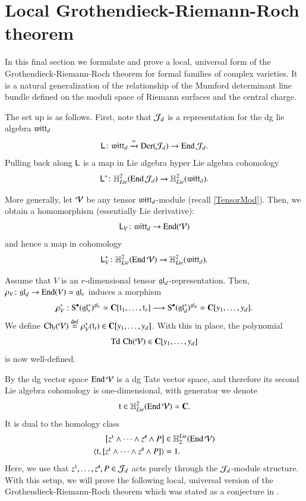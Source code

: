 \documentclass[main.tex]{subfiles}
\begin{document}
\section{Local Grothendieck-Riemann-Roch theorem}\label{s:GRR}

In this final section we formulate and prove a local, universal form of the Grothendieck-Riemann-Roch theorem for
formal families of complex varieties.
It is a natural generalization of the relationship of the Mumford determinant line bundle defined on the
moduli space of Riemann surfaces and the central charge. 

The set up is as follows.
First, note that $\mathcal J_d$ is a representation for the dg lie algebra $\mathfrak{witt}_d$
\[
 \mathsf L \colon \mathfrak{witt}_d \xrightarrow{\simeq} \operatorname{Der}( \mathcal J_d) \to \operatorname{End} \mathcal J_d .
\]
Pulling back along $\mathsf L$ is a map in Lie algebra hyper Lie algebra cohomology 
\begin{equation}\label{}
  \mathsf L^* \colon \mathbb H^2_{Lie}(\operatorname{End} \mathcal J_d) \to \mathbb H^2_{Lie} (\mathfrak{witt}_d) . 
\end{equation}

More generally, let $\mathcal V$ be any tensor $\mathfrak{witt}_d$-module (recall \ref{TensorMod}). 
Then, we obtain a homomorphism (essentially Lie derivative): 
\begin{equation}\label{}
  \mathsf L_{V} \colon \mathfrak{witt}_d \to \operatorname{End}(\mathcal V)  
\end{equation}
and hence a map in cohomology 
\begin{equation}\label{}
  \mathsf L_V^* \colon \mathbb H^2_{Lie}(\operatorname{End} \mathcal V) \to \mathbb H^2_{Lie}(\mathfrak{witt}_d) .
\end{equation}

Assume that $V$ is an $r$-dimensional tensor $\mathfrak{gl}_d$-representation. 
Then, $\rho_V \colon \mathfrak{gl}_d \to \operatorname{End}(V)\simeq \mathfrak{gl}_r$ induces a morphism
\[
\rho_V^*: \operatorname{S}^\bullet(\mathfrak{gl}_r^*)^{\mathfrak{gl}_r}\simeq \mathbf{C}[\mathfrak{t}_1,\ldots,\mathfrak{t}_r]\longrightarrow \operatorname{S}^\bullet(\mathfrak{gl}_d^*)^{\mathfrak{gl}_d}\simeq \mathbf{C}[y_1,\ldots,y_d].
\]
We define $\operatorname{Ch}_i(\mathcal V) \overset{\rm def}{=} \rho_V^*(\mathfrak{t}_i)\in \mathbf{C}[y_1,\ldots,y_d]$. With this in place, the polynomial
\[
\operatorname{Td}\,\operatorname{Ch}(\mathcal V)\in \mathbf{C}[y_1,\ldots,y_d]
\]
is now well-defined.

By \cite[theorem 5.4.16]{FHK} the dg vector space $\operatorname{End} \mathcal V$ is a dg Tate vector space, and therefore its second Lie algebra
cohomology is one-dimensional, with generator we denote 
\begin{equation}\label{}
  \mathfrak{t} \in \mathbb H^2_{Lie}(\operatorname{End}\mathcal V) \simeq \mathbf{C}.
\end{equation}
It is dual to the homology class
\begin{align}\label{eq:universalV}
  \left[z^{\textbf{\texttt{\tiny{1}}}} \wedge \cdots \wedge z^{\textbf{\texttt{\tiny{d}}}} \wedge P \right]  &  \in 
  \mathbb H_2^{Lie}( \operatorname{End} \mathcal V) \\ 
  \langle\mathfrak{t}, [z^{\textbf{\texttt{\tiny{1}}}} \wedge \cdots \wedge z^{\textbf{\texttt{\tiny{d}}}} \wedge P] \rangle & = 1 .
\end{align}
Here, we use that $z^{\textbf{\texttt{\tiny{1}}}}, \ldots, z^{\textbf{\texttt{\tiny{d}}}}, P \in \mathcal J_d$ acts purely through the $\mathcal J_d$-module structure.
With this setup, we will prove the following local, universal version of the Grothendieck-Riemann-Roch theorem which
was stated as a
conjecture in \cite{KapranovNotes}.
\end{document}
